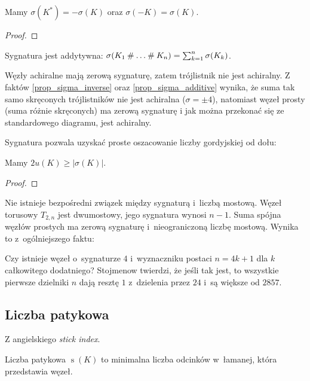 \begin{proposition} \label{prop_sigma_inverse}
    Mamy $\sigma(K^*) = -\sigma(K)$ oraz $\sigma(-K) = \sigma(K)$.
\end{proposition}

\begin{proof}
\end{proof}

\begin{proposition} \label{prop_sigma_additive}
    Sygnatura jest addytywna: $\sigma(K_1 \mathbin{\#} \ldots \mathbin{\#} K_n) = \sum_{k=1}^n \sigma(K_k)$.
\end{proposition}

Węzły achiralne mają zerową sygnaturę, zatem trójlistnik nie jest achiralny.
Z faktów \ref{prop_sigma_inverse} oraz \ref{prop_sigma_additive} wynika, że suma tak samo skręconych trójlistników nie jest achiralna ($\sigma = \pm 4$), natomiast węzeł prosty (suma różnie skręconych) ma zerową sygnaturę i jak można przekonać się ze standardowego diagramu, jest achiralny.

Sygnatura pozwala uzyskać proste oszacowanie liczby gordyjskiej od dołu:

\begin{proposition}
    Mamy $2 u(K) \ge |\sigma(K)|$.
\end{proposition}

\begin{proof}
\end{proof}

Nie istnieje bezpośredni związek między sygnaturą i~liczbą mostową.
Węzeł torusowy $T_{2,n}$ jest dwumostowy, jego sygnatura wynosi $n - 1$.
Suma spójna węzłów prostych ma zerową sygnaturę i~nieograniczoną liczbę mostową.
Wynika to z~ogólniejszego faktu:


Czy istnieje węzeł o~sygnaturze $4$ i~wyznaczniku postaci $n = 4k + 1$ dla $k$ całkowitego dodatniego?
Stojmenow twierdzi, że jeśli tak jest, to wszystkie pierwsze dzielniki $n$ dają resztę $1$ z~dzielenia przez $24$ i~są większe od $2857$.


\subsection{Liczba patykowa} %
\label{sub:stick_index}
Z angielskiego \emph{stick index}.

\begin{definition}
    Liczba patykowa $\operatorname{s}(K)$ to minimalna liczba odcinków w~łamanej, która przedstawia węzeł.
\end{definition}

